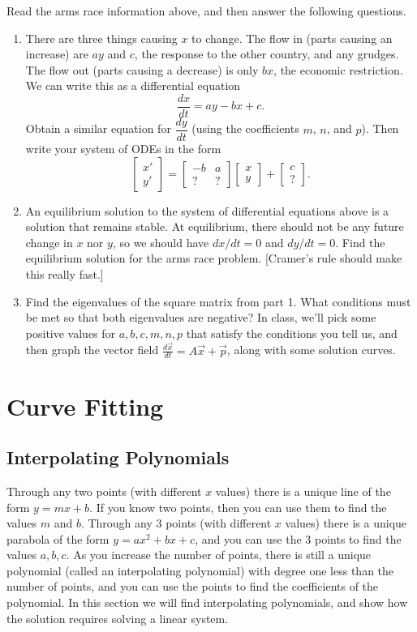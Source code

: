 \begin{problem}
Read the arms race information above, and then answer the following questions.
\begin{enumerate}
 \item There are three things causing $x$ to change. The flow in (parts causing an increase) are $ay$ and $c$, the response to the other country, and any grudges.  The flow out (parts causing a decrease) is only $bx$, the economic restriction.  We can write this as a differential equation $$\frac{dx}{dt} = ay-bx+c.$$ Obtain a similar equation for $\dfrac{dy}{dt}$ (using the coefficients $m$, $n$, and $p$). Then write your system of ODEs in the form 
$$
\begin{bmatrix}x'\\y'\end{bmatrix}
=
\begin{bmatrix}-b&a\\?&?\end{bmatrix}
\begin{bmatrix}x\\y\end{bmatrix}
+
\begin{bmatrix}c\\?\end{bmatrix}.
$$ 
 \item An equilibrium solution to the system of differential equations above is a solution that remains stable. At equilibrium, there should not be any future change in $x$ nor $y$, so we should have $dx/dt=0$ and $dy/dt=0$. Find the equilibrium solution for the arms race problem. [Cramer's rule should make this really fast.]
 \item Find the eigenvalues of the square matrix from part 1. What conditions must be met so that both eigenvalues are negative? In class, we'll pick some positive values for $a,b,c,m,n,p$ that satisfy the conditions you tell us, and then graph the vector field $\frac{d \vec x}{dt} = A\vec x+\vec p$, along with some solution curves.  
\end{enumerate}
\end{problem}


\section{Curve Fitting}
\subsection{Interpolating Polynomials}
Through any two points (with different $x$ values) there is a unique line of the form $y=mx+b$. If you know two points, then you can use them to find the values $m$ and $b$.  Through any 3 points (with different $x$ values) there is a unique parabola of the form $y=ax^2+bx+c$, and you can use the 3 points to find the values $a,b,c$.  As you increase the number of points, there is still a unique polynomial (called an interpolating polynomial) with degree one less than the number of points, and you can use the points to find the coefficients of the polynomial. In this section we will find interpolating polynomials, and show how the solution requires solving a linear system.

